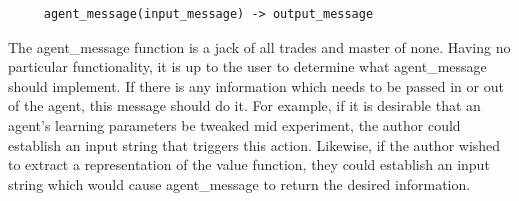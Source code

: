 \documentclass[11pt]{article}
\begin{document}
\begin{verbatim}
     agent_message(input_message) -> output_message
\end{verbatim}     
The agent\_message function is a jack of all trades and master of none. Having no particular functionality, it is up to the user to determine what agent\_message should implement. If there is any information which needs to be passed in or out of the agent, this message should do it. For example, if it is desirable that an agent's learning parameters be tweaked mid experiment, the author could establish an input string that triggers this action. Likewise, if the author wished to extract a representation of the value function, they could establish an input string which would cause agent\_message to return the desired information.
                          
\end{document}
